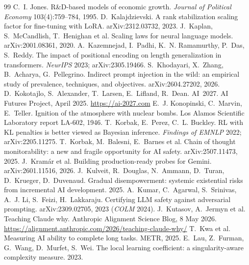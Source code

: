 \begin{thebibliography}{99}
 C.~I. Jones. R\&D-based models of economic growth. \emph{Journal of Political Economy} 103(4):759--784, 1995.
 D.~Kalajdzievski. A rank stabilization scaling factor for fine-tuning with LoRA. arXiv:2312.03732, 2023.
 J.~Kaplan, S.~McCandlish, T.~Henighan et al. Scaling laws for neural language models. arXiv:2001.08361, 2020.
 A.~Kazemnejad, I.~Padhi, K.~N. Ramamurthy, P.~Das, S.~Reddy. The impact of positional encoding on length generalization in transformers. \emph{NeurIPS} 2023; arXiv:2305.19466.
 S.~Khodayari, X.~Zhang, B.~Acharya, G.~Pellegrino. Indirect prompt injection in the wild: an empirical study of prevalence, techniques, and objectives. arXiv:2604.27202, 2026.
 D.~Kokotajlo, S.~Alexander, T.~Larsen, E.~Lifland, R.~Dean. AI~2027. AI Futures Project, April 2025. \url{https://ai-2027.com}
 E.~J. Konopinski, C.~Marvin, E.~Teller. Ignition of the atmosphere with nuclear bombs. Los Alamos Scientific Laboratory report LA-602, 1946.
 T.~Korbak, E.~Perez, C.~L. Buckley. RL with KL penalties is better viewed as Bayesian inference. \emph{Findings of EMNLP} 2022; arXiv:2205.11275.
 T.~Korbak, M.~Balesni, E.~Barnes et al. Chain of thought monitorability: a new and fragile opportunity for AI safety. arXiv:2507.11473, 2025.
 J.~Kram{\'a}r et al. Building production-ready probes for Gemini. arXiv:2601.11516, 2026.
 J.~Kulveit, R.~Douglas, N.~Ammann, D.~Turan, D.~Krueger, D.~Duvenaud. Gradual disempowerment: systemic existential risks from incremental AI development. 2025.
 A.~Kumar, C.~Agarwal, S.~Srinivas, A.~J. Li, S.~Feizi, H.~Lakkaraju. Certifying LLM safety against adversarial prompting. arXiv:2309.02705, 2023 (\emph{COLM} 2024).
 J.~Kutasov, A.~Jermyn et al. Teaching Claude why. Anthropic Alignment Science Blog, 8 May 2026. \url{https://alignment.anthropic.com/2026/teaching-claude-why/}
 T.~Kwa et al. Measuring AI ability to complete long tasks. METR, 2025.
 E.~Lau, Z.~Furman, G.~Wang, D.~Murfet, S.~Wei. The local learning coefficient: a singularity-aware complexity measure. 2023.

\end{thebibliography}
